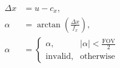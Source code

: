 \begin{align*}
    \Delta x &= u - c_x,\\
    \alpha &= \arctan\!\left(\frac{\Delta x}{f_x}\right),\\
    \alpha &= \begin{cases}
        \alpha,& |\alpha| < \tfrac{\mathrm{FOV}}{2}\\
        \text{invalid},& \text{otherwise}
    \end{cases}
\end{align*}
